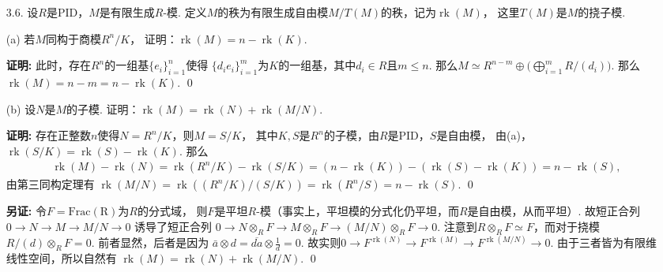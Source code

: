     \begin{enumerate}
    \item[3.6.] 设$R$是PID，$M$是有限生成$R$-模. 
    定义$M$的秩为有限生成自由模$M/T(M)$的秩，记为$\operatorname{rk}(M)$，
    这里$T(M)$是$M$的挠子模.
    \item[(a)] 若$M$同构于商模$R^{n}/K$，
        证明：$\operatorname{rk}(M)=n-\operatorname{rk}(K)$.
    \item[\textbf{证明:}]
        此时，存在$R^{n}$的一组基$\{e_{i}\}_{i=1}^{n}$使得
        $\{d_{i}e_{i}\}_{i=1}^{m}$为$K$的一组基，其中$d_{i} \in R$且$m \leq n$. 
        那么$M \simeq R^{n-m} \oplus \big(\bigoplus_{i=1}^{m} R/(d_{i})\big)$.
        那么$\operatorname{rk}(M)=n-m=n-\operatorname{rk}(K)$. \qed
    \item[(b)] 设$N$是$M$的子模. 
        证明：$\operatorname{rk}(M)=\operatorname{rk}(N)+\operatorname{rk}(M/N)$.
    \item[\textbf{证明:}]
        存在正整数$n$使得$N=R^{n}/K$，则$M=S/K$，
        其中$K,S$是$R^{n}$的子模，由$R$是PID，$S$是自由模，
        由(a)，$\operatorname{rk}(S/K)=\operatorname{rk}(S)-\operatorname{rk}(K)$. 
        那么
        \begin{align*}
        \operatorname{rk}(M)-\operatorname{rk}(N) 
        = \operatorname{rk}(R^{n}/K) - \operatorname{rk}(S/K) 
        = (n-\operatorname{rk}(K)) - (\operatorname{rk}(S)-\operatorname{rk}(K)) 
        = n - \operatorname{rk}(S),
        \end{align*}
        由第三同构定理有
        $\operatorname{rk}(M/N) = \operatorname{rk}((R^{n}/K)/(S/K)) 
        = \operatorname{rk}(R^n/S)= n - \operatorname{rk}(S)$. \qed
    \item[\textbf{另证:}]
        令$F=\operatorname{Frac(R)}$为$R$的分式域，
        则$F$是平坦$R$-模（事实上，平坦模的分式化仍平坦，而$R$是自由模，从而平坦）. 
        故短正合列$0 \rightarrow N \rightarrow M \rightarrow M/N \rightarrow 0$
        诱导了短正合列
        $0 \rightarrow N \otimes_{R} F \rightarrow M \otimes_{R} F 
        \rightarrow (M/N) \otimes_{R} F \rightarrow 0$. 
        注意到$R \otimes_{R} F \simeq F$，而对于挠模$R/(d) \otimes_{R} F =0$. 
        前者显然，后者是因为
        $\bar{a} \otimes d = \overline{da} \otimes \frac{1}{d} =0$. 
        故实则$0 \rightarrow F^{\operatorname{rk}(N)} 
        \rightarrow F^{\operatorname{rk}(M)} 
        \rightarrow F^{\operatorname{rk}(M/N)} \rightarrow 0$. 
        由于三者皆为有限维线性空间，所以自然有
        $\operatorname{rk}(M)=\operatorname{rk}(N)+\operatorname{rk}(M/N)$. \qed
    \end{enumerate}

